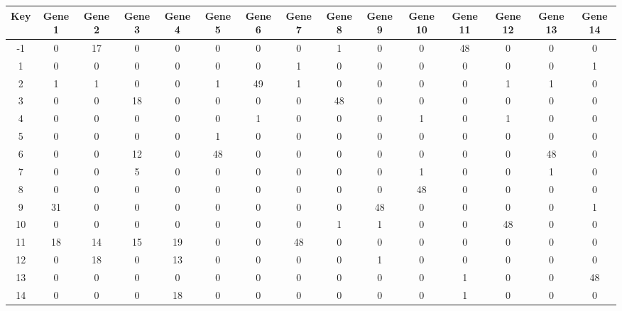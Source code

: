 \begin{tabular}{|c|c|c|c|c|c|c|c|c|c|c|c|c|c|c|}
\hline
Key & Gene 1 & Gene 2 & Gene 3 & Gene 4 & Gene 5 & Gene 6 & Gene 7 & Gene 8 & Gene 9 & Gene 10 & Gene 11 & Gene 12 & Gene 13 & Gene 14 \\
\hline
-1 & 0 & 17 & 0 & 0 & 0 & 0 & 0 & 1 & 0 & 0 & 48 & 0 & 0 & 0 \\
1 & 0 & 0 & 0 & 0 & 0 & 0 & 1 & 0 & 0 & 0 & 0 & 0 & 0 & 1 \\
2 & 1 & 1 & 0 & 0 & 1 & 49 & 1 & 0 & 0 & 0 & 0 & 1 & 1 & 0 \\
3 & 0 & 0 & 18 & 0 & 0 & 0 & 0 & 48 & 0 & 0 & 0 & 0 & 0 & 0 \\
4 & 0 & 0 & 0 & 0 & 0 & 1 & 0 & 0 & 0 & 1 & 0 & 1 & 0 & 0 \\
5 & 0 & 0 & 0 & 0 & 1 & 0 & 0 & 0 & 0 & 0 & 0 & 0 & 0 & 0 \\
6 & 0 & 0 & 12 & 0 & 48 & 0 & 0 & 0 & 0 & 0 & 0 & 0 & 48 & 0 \\
7 & 0 & 0 & 5 & 0 & 0 & 0 & 0 & 0 & 0 & 1 & 0 & 0 & 1 & 0 \\
8 & 0 & 0 & 0 & 0 & 0 & 0 & 0 & 0 & 0 & 48 & 0 & 0 & 0 & 0 \\
9 & 31 & 0 & 0 & 0 & 0 & 0 & 0 & 0 & 48 & 0 & 0 & 0 & 0 & 1 \\
10 & 0 & 0 & 0 & 0 & 0 & 0 & 0 & 1 & 1 & 0 & 0 & 48 & 0 & 0 \\
11 & 18 & 14 & 15 & 19 & 0 & 0 & 48 & 0 & 0 & 0 & 0 & 0 & 0 & 0 \\
12 & 0 & 18 & 0 & 13 & 0 & 0 & 0 & 0 & 1 & 0 & 0 & 0 & 0 & 0 \\
13 & 0 & 0 & 0 & 0 & 0 & 0 & 0 & 0 & 0 & 0 & 1 & 0 & 0 & 48 \\
14 & 0 & 0 & 0 & 18 & 0 & 0 & 0 & 0 & 0 & 0 & 1 & 0 & 0 & 0 \\
\hline
\end{tabular}